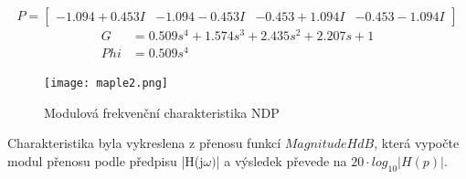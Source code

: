 \begin{equation}
P = 
\begin{bmatrix}
-1.094 + 0.453I & -1.094 - 0.453I & -0.453 + 1.094I & -0.453 - 1.094I
\end{bmatrix}
\end{equation}
\begin{align}
G &= 0.509s^4 + 1.574s^3 + 2.435s^2 + 2.207s + 1\\
Phi &=  0.509s^4
\end{align}
\begin{figure}[h]
\centering
\texttt{[image: maple2.png]}
\caption{Modulová frekvenční charakteristika NDP}
\end{figure}
\noindent Charakteristika byla vykreslena z přenosu funkcí $MagnitudeHdB$, která vypočte modul přenosu podle předpisu |H(j$\omega)$| a výsledek převede na $20 \cdot log_{10} |H(p)|$.
